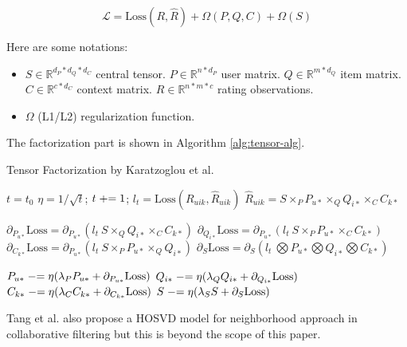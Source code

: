 \documentclass[letter paper, 11pt]{article}
\begin{document}
	\begin{equation}
		\label{eqn:tensor-obj}
		\mathcal{L} = \text{Loss}(R, \hat{R}) +  \Omega(P, Q, C) + \Omega(S)
	\end{equation}
	
	Here are some notations: 
	\begin{itemize}
		\item $S\in \mathbb{R}^{d_P*d_Q*d_C}$ central tensor. $P \in \mathbb{R}^{n*d_P}$ user matrix. $Q \in \mathbb{R}^{m*d_Q}$ item matrix. $C\in \mathbb{R}^{c*d_C}$ context matrix. $R \in \mathbb{R}^{n * m * c}$ rating observations.
		
		\item $\Omega$ (L1/L2) regularization function.
	\end{itemize}

	The factorization part is shown in Algorithm \ref{alg:tensor-alg}.
	
	\begin{algorithm}[H]
		\caption{Tensor Factorization by Karatzoglou et al.\cite{tensor}}
		\label{alg:tensor-alg}
		\begin{algorithmic}
			\STATE $t = t_0$
				\STATE $\eta = 1/\sqrt{t}$; $t \mathrel{+}= 1$; $l_t = \text{Loss}(R_{uik}, \hat{R}_{uik})$
				\STATE $\hat{R}_{uik} = S \times_P P_{u*} \times_Q Q_{i*} \times_C C_{k*}$
				
				\STATE $\partial_{P_{u*}} \text{Loss} = \partial_{P_{u*}} (l_t\ S \times_Q Q_{i*} \times_C C_{k*})$
				\STATE $\partial_{Q_{i*}} \text{Loss} = \partial_{P_{u*}} (l_t\ S \times_P P_{u*} \times_C C_{k*})$
				\STATE $\partial_{C_{k*}} \text{Loss} = \partial_{P_{u*}} (l_t\ S \times_P P_{u*} \times_Q Q_{i*})$
				\STATE $\partial_{S} \text{Loss} = \partial_{S} (l_t\ \bigotimes P_{u*} \bigotimes Q_{i*} \bigotimes C_{k*})$
												
				\STATE $P_{u*} \mathrel{-}= \eta(\lambda_P P_{u*} + \partial_{P_{u*}} \text{Loss})$
				\STATE $Q_{i*} \mathrel{-}= \eta(\lambda_Q Q_{i*} + \partial_{Q_{i*}} \text{Loss})$
				\STATE $C_{k*} \mathrel{-}= \eta(\lambda_C C_{k*} + \partial_{C_{k*}} \text{Loss})$
				\STATE $S \mathrel{-}= \eta(\lambda_S S + \partial_{S} \text{Loss})$
			\ENDWHILE
		\end{algorithmic}
	\end{algorithm}

	Tang et al. also propose a HOSVD model for neighborhood approach in collaborative filtering \cite{tensor-neighbor} but this is beyond the scope of this paper.
	
\end{document}
